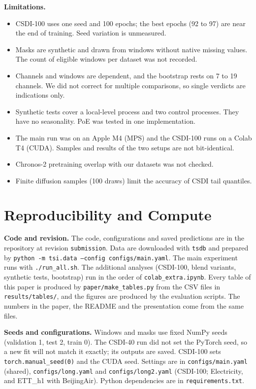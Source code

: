 \documentclass[10pt,twocolumn]{article}
\newcommand{\revision}{\texttt{submission}}
\newcommand{\Chr}{Chronos-2}
\begin{document}
\textbf{Limitations.}
\begin{itemize}
\item CSDI-100 uses one seed and 100 epochs; the best epochs (92 to 97) are near the end of training. Seed variation is unmeasured.
\item Masks are synthetic and drawn from windows without native missing values. The count of eligible windows per dataset was not recorded.
\item Channels and windows are dependent, and the bootstrap rests on 7 to 19 channels. We did not correct for multiple comparisons, so single verdicts are indications only.
\item Synthetic tests cover a local-level process and two control processes. They have no seasonality. PoE was tested in one implementation.
\item The main run was on an Apple M4 (MPS) and the CSDI-100 runs on a Colab T4 (CUDA). Samples and results of the two setups are not bit-identical.
\item \Chr{} pretraining overlap with our datasets was not checked.
\item Finite diffusion samples (100 draws) limit the accuracy of CSDI tail quantiles.
\end{itemize}

\section{Reproducibility and Compute}
\textbf{Code and revision.} The code, configurations and saved predictions are in the repository at revision \revision. Data are downloaded with \texttt{tsdb} and prepared by \texttt{python -m tsi.data --config configs/main.yaml}. The main experiment runs with \texttt{./run\_all.sh}. The additional analyses (CSDI-100, blend variants, synthetic tests, bootstrap) run in the order of \texttt{colab\_extra.ipynb}. Every table of this paper is produced by \texttt{paper/make\_tables.py} from the CSV files in \texttt{results/tables/}, and the figures are produced by the evaluation scripts. The numbers in the paper, the README and the presentation come from the same files.

\textbf{Seeds and configurations.} Windows and masks use fixed NumPy seeds (validation 1, test 2, train 0). The CSDI-40 run did not set the PyTorch seed, so a new fit will not match it exactly; its outputs are saved. CSDI-100 sets \texttt{torch.manual\_seed(0)} and the CUDA seed. Settings are in \texttt{configs/main.yaml} (shared), \texttt{configs/long.yaml} and \texttt{configs/long2.yaml} (CSDI-100; Electricity, and ETT\_h1 with BeijingAir). Python dependencies are in \texttt{requirements.txt}.
\end{document}
